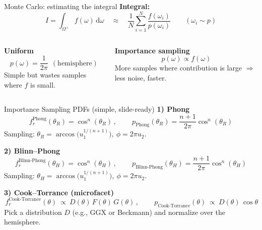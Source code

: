 \documentclass[aspectratio=169]{beamer}
\newcommand{\Hemisphere}{\Omega^+}
\begin{document}
\begin{frame}{Monte Carlo: estimating the integral}
\textbf{Integral:}\quad
\[
I=\int_{\Hemisphere} f(\omega)\,\mathrm{d}\omega
\quad \approx \quad
\frac{1}{N}\sum_{i=1}^N \frac{f(\omega_i)}{p(\omega_i)}
\qquad (\omega_i \sim p)
\]

\medskip
\begin{columns}
\begin{column}{0.5\textwidth}
\textbf{Uniform}
\[
p(\omega)=\frac{1}{2\pi}\ \ (\text{hemisphere})
\]
Simple but wastes samples where $f$ is small.
\end{column}
\begin{column}{0.5\textwidth}
\textbf{Importance sampling}
\[
p(\omega)\propto f(\omega)
\]
More samples where contribution is large $\Rightarrow$ less noise, faster.
\end{column}
\end{columns}
\end{frame}

\begin{frame}{Importance Sampling PDFs (simple, slide-ready)}
\textbf{1) Phong}
\[
\boxed{\,f_r^{\text{Phong}}(\theta_R)=\cos^n(\theta_R)\,},\qquad
\boxed{\,p_{\text{Phong}}(\theta_R)=\frac{n+1}{2\pi}\cos^n(\theta_R)\,}
\]
Sampling: \(\theta_R=\arccos\!\big(u_1^{1/(n+1)}\big),\ \phi=2\pi u_2\).

\medskip
\textbf{2) Blinn--Phong}
\[
\boxed{\,f_r^{\text{Blinn-Phong}}(\theta_H)=\cos^n(\theta_H)\,},\qquad
\boxed{\,p_{\text{Blinn-Phong}}(\theta_H)=\frac{n+1}{2\pi}\cos^n(\theta_H)\,}
\]
Sampling: \(\theta_H=\arccos\!\big(u_1^{1/(n+1)}\big),\ \phi=2\pi u_2\).

\medskip
\textbf{3) Cook--Torrance (microfacet)}
\[
\boxed{\,f_r^{\text{Cook-Torrance}}(\theta)\ \propto\ D(\theta)\,F(\theta)\,G(\theta)\,},\qquad
\boxed{\,p_{\text{Cook-Torrance}}(\theta)\ \propto\ D(\theta)\,\cos\theta\,}
\]
Pick a distribution \(D\) (e.g., GGX or Beckmann) and normalize over the hemisphere.
\end{frame}
\end{document}
